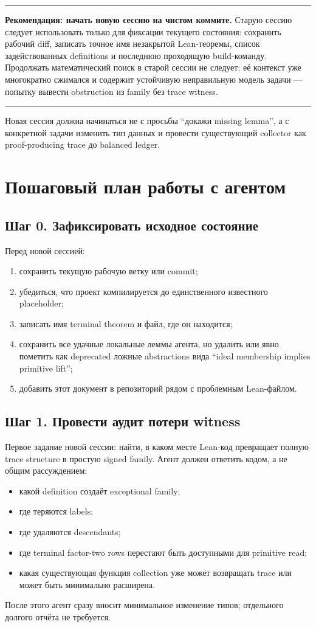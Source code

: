 \documentclass[11pt,a4paper]{article}
\theoremstyle{definition}
\theoremstyle{remark}
\newenvironment{keybox}{%
  \par\medskip\noindent
  \begin{center}\begin{minipage}{0.94\textwidth}
  \color{blue!55!black}\hrule\vspace{0.55em}
}{%
  \vspace{0.35em}\hrule\end{minipage}\end{center}\medskip
}
\begin{document}
\begin{keybox}
\textbf{Рекомендация: начать новую сессию на чистом коммите.}
Старую сессию следует использовать только для фиксации текущего состояния:
сохранить рабочий diff, записать точное имя незакрытой Lean-теоремы, список
задействованных definitions и последнюю проходящую build-команду. Продолжать
математический поиск в старой сессии не следует: её контекст уже многократно
сжимался и содержит устойчивую неправильную модель задачи --- попытку вывести
obstruction из family без trace witness.
\end{keybox}

Новая сессия должна начинаться не с просьбы ``докажи missing lemma'', а с
конкретной задачи изменить тип данных и провести существующий collector как
proof-producing trace до balanced ledger.

\section{Пошаговый план работы с агентом}

\subsection{Шаг 0. Зафиксировать исходное состояние}

Перед новой сессией:
\begin{enumerate}
\item сохранить текущую рабочую ветку или commit;
\item убедиться, что проект компилируется до единственного известного
placeholder;
\item записать имя terminal theorem и файл, где он находится;
\item сохранить все удачные локальные леммы агента, но удалить или явно
пометить как deprecated ложные abstractions вида ``ideal membership implies
primitive lift'';
\item добавить этот документ в репозиторий рядом с проблемным Lean-файлом.
\end{enumerate}

\subsection{Шаг 1. Провести аудит потери witness}

Первое задание новой сессии: найти, в каком месте Lean-код превращает полную
trace structure в простую signed family. Агент должен ответить кодом, а не
общим рассуждением:
\begin{itemize}
\item какой definition создаёт exceptional family;
\item где теряются labels;
\item где удаляются descendants;
\item где terminal factor-two rows перестают быть доступными для primitive
read;
\item какая существующая функция collection уже может возвращать trace или
может быть минимально расширена.
\end{itemize}
После этого агент сразу вносит минимальное изменение типов; отдельного
долгого отчёта не требуется.
\end{document}
